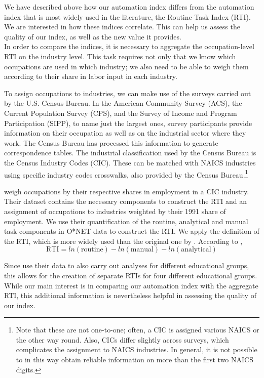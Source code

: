 \documentclass[11pt,a4paper]{article}
\begin{document}
We have described above how our automation index differs from the automation index that is most widely used in the literature, the Routine Task Index (RTI). We are interested in how these indices correlate. This can help us assess the quality of our index, as well as the new value it provides.\\
In order to compare the indices, it is necessary to aggregate the occupation-level RTI on the industry level. This task requires not only that we know which occupations are used in which industry; we also need to be able to weigh them according to their share in labor input in each industry.

To assign occupations to industries, we can make use of the surveys carried out by the U.S. Census Bureau. In the American Community Survey (ACS), the Current Population Survey (CPS), and the Survey of Income and Program Participation (SIPP), to name just the largest ones, survey participants provide information on their occupation as well as on the industrial sector where they work. The Census Bureau has processed this information to generate correspondence tables. The industrial classification used by the Census Bureau is the Census Industry Codes (CIC). These can be matched with NAICS industries using specific industry codes crosswalks, also provided by the Census Bureau.\footnote{Note that these are not one-to-one; often, a CIC is assigned various NAICS or the other way round. Also, CICs differ slightly across surveys, which complicates the assignment to NAICS industries. In general, it is not possible to in this way obtain reliable information on more than the first two NAICS digits.}

\cite{ALM2003} weigh occupations by their respective shares in employment in a CIC industry. Their dataset contains the necessary components to construct the RTI and an assignment of occupations to industries weighted by their 1991 share of employment. We use their quantification of the routine, analytical and manual task components in O*NET data to construct the RTI. We apply the \cite{AD2013} definition of the RTI, which is more widely used than the original one by \cite{ALM2003}. According to \cite{AD2013},
\begin{equation}
 \text{RTI} = ln(\text{routine}) - ln(\text{manual}) - ln(\text{analytical})
\end{equation}  

Since \cite{ALM2003} use their data to also carry out analyses for different educational groups, this allows for the creation of separate RTIs for four different educational groups. While our main interest is in comparing our automation index with the aggregate RTI, this additional information is nevertheless helpful in assessing the quality of our index. 
\end{document}
